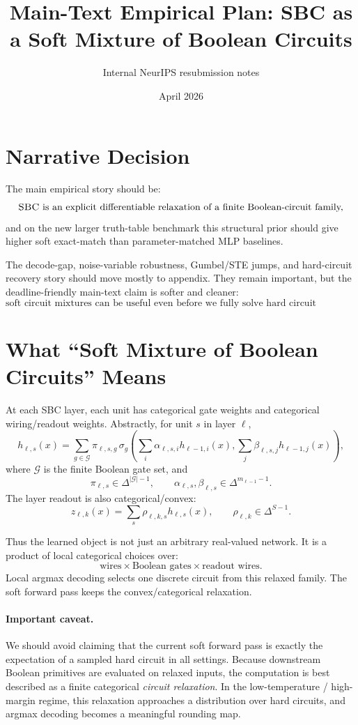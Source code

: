 \documentclass[11pt]{article}
\title{Main-Text Empirical Plan: SBC as a Soft Mixture of Boolean Circuits}
\author{Internal NeurIPS resubmission notes}
\date{April 2026}
\newcommand{\SBC}{\textsc{SBC}}
\newcommand{\MLP}{\textsc{MLP}}
\begin{document}
\maketitle

\section{Narrative Decision}

The main empirical story should be:
\[
  \text{\SBC{} is an explicit differentiable relaxation of a finite Boolean-circuit family,}
\]
and on the new larger truth-table benchmark this structural prior should give higher soft exact-match than parameter-matched \MLP{} baselines.

The decode-gap, noise-variable robustness, Gumbel/STE jumps, and hard-circuit recovery story should move mostly to appendix.  They remain important, but the deadline-friendly main-text claim is softer and cleaner:
\[
  \text{soft circuit mixtures can be useful even before we fully solve hard circuit recovery.}
\]

\section{What ``Soft Mixture of Boolean Circuits'' Means}

At each \SBC{} layer, each unit has categorical gate weights and categorical wiring/readout weights.  Abstractly, for unit \(s\) in layer \(\ell\),
\[
  h_{\ell,s}(x)
  =
  \sum_{g \in \mathcal G}
  \pi_{\ell,s,g}\,
  \sigma_g
  \left(
    \sum_i \alpha_{\ell,s,i} h_{\ell-1,i}(x),
    \sum_j \beta_{\ell,s,j} h_{\ell-1,j}(x)
  \right),
\]
where \(\mathcal G\) is the finite Boolean gate set, and
\[
  \pi_{\ell,s}\in \Delta^{|\mathcal G|-1},
  \qquad
  \alpha_{\ell,s},\beta_{\ell,s}\in \Delta^{m_{\ell-1}-1}.
\]
The layer readout is also categorical/convex:
\[
  z_{\ell,k}(x) = \sum_s \rho_{\ell,k,s} h_{\ell,s}(x),
  \qquad
  \rho_{\ell,k}\in \Delta^{S-1}.
\]

Thus the learned object is not just an arbitrary real-valued network.  It is a product of local categorical choices over:
\[
  \text{wires} \times \text{Boolean gates} \times \text{readout wires}.
\]
Local argmax decoding selects one discrete circuit from this relaxed family.  The soft forward pass keeps the convex/categorical relaxation.

\paragraph{Important caveat.}
We should avoid claiming that the current soft forward pass is exactly the expectation of a sampled hard circuit in all settings.  Because downstream Boolean primitives are evaluated on relaxed inputs, the computation is best described as a finite categorical \emph{circuit relaxation}.  In the low-temperature / high-margin regime, this relaxation approaches a distribution over hard circuits, and argmax decoding becomes a meaningful rounding map.
\end{document}
